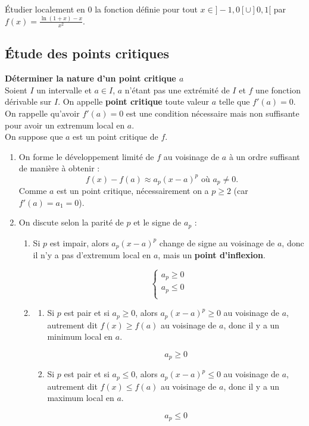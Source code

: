 \begin{Ex}
Étudier localement en $0$ la fonction définie pour tout $x \in ]-1,0[ \cup ]0,1[$ par $f(x) = \frac{\ln(1+x) - x}{x^2}$.\\
\end{Ex}

\subsection{Étude des points critiques}
\begin{Meth}
\textbf{Déterminer la nature d’un point critique $a$}\\

Soient $I$ un intervalle et $a \in I$, $a$ n’étant pas une extrémité de $I$ et $f$ une fonction dérivable sur $I$. On appelle \og  \textbf{point critique} \fg{}  toute valeur $a$ telle que $f'(a) = 0$. On rappelle qu’avoir $f'(a) = 0$ est une condition nécessaire mais non suffisante pour avoir un extremum local en $a$.\\

On suppose que $a$ est un point critique de $f$.\\
\begin{enumerate}
\item On forme le développement limité de $f$ au voisinage de $a$ à un ordre suffisant de manière à obtenir :
$$f(x) - f(a) \approx a_p (x - a)^p \text{ où } a_p \neq 0.$$
Comme $a$ est un point critique, nécessairement on a $p \geq 2$ (car $f'(a) = a_1 = 0$).

\item On discute selon la parité de $p$ et le signe de $a_p$ :
\begin{enumerate}
\item Si $p$ est impair, alors $a_p (x - a)^p$ change de signe au voisinage de $a$, donc il n’y a pas d’extremum local en $a$, mais un\textbf{ point d’inflexion}.

    \[
    \begin{cases}
    a_p \geq 0 \\
    a_p \leq 0 \\
    \end{cases}
    \]

  \item 
  \begin{enumerate}
\item Si $p$ est pair  et si $a_p \geq 0$, alors $a_p (x - a)^p \geq 0$ au voisinage de $a$, autrement dit $f(x) \geq f(a)$ au voisinage de $a$, donc il y a un minimum local en $a$.
  
    \[
    a_p \geq 0
    \]

  \item  Si $p$ est pair et si $a_p \leq 0$, alors $a_p (x - a)^p \leq 0$ au voisinage de $a$, autrement dit $f(x) \leq f(a)$ au voisinage de $a$, donc il y a un maximum local en $a$.
  
    \[
    a_p \leq 0
    \]
        \end{enumerate}
       \end{enumerate} 
    \end{enumerate}
\end{Meth}



